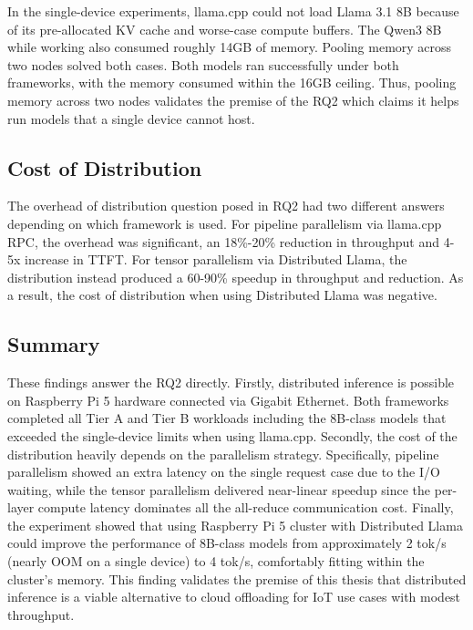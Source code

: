 In the single-device experiments, llama.cpp could not load Llama 3.1 8B because of its pre-allocated KV cache and worse-case compute buffers. The Qwen3 8B while working also consumed roughly 14GB of memory. Pooling memory across two nodes solved both cases. Both models ran successfully under both frameworks, with the memory consumed within the 16GB ceiling. Thus, pooling memory across two nodes validates the premise of the RQ2 which claims it helps run models that a single device cannot host.

\subsection{Cost of Distribution}
The overhead of distribution question posed in RQ2 had two different answers depending on which framework is used. For pipeline parallelism via llama.cpp RPC, the overhead was significant, an 18\%-20\% reduction in throughput and 4-5x increase in TTFT. For tensor parallelism via Distributed Llama, the distribution instead produced a 60-90\% speedup in throughput and reduction. As a result, the cost of distribution when using Distributed Llama was negative.

\subsection{Summary}
These findings answer the RQ2 directly. Firstly, distributed inference is possible on Raspberry Pi 5 hardware connected via Gigabit Ethernet. Both frameworks completed all Tier A and Tier B workloads including the 8B-class models that exceeded the single-device limits when using llama.cpp. Secondly, the cost of the distribution heavily depends on the parallelism strategy. Specifically, pipeline parallelism showed an extra latency on the single request case due to the I/O waiting, while the tensor parallelism delivered near-linear speedup since the per-layer compute latency dominates all the all-reduce communication cost. Finally, the experiment showed that using Raspberry Pi 5 cluster with Distributed Llama could improve the performance of 8B-class models from approximately 2 tok/s (nearly OOM on a single device) to 4 tok/s, comfortably fitting within the cluster's memory. This finding validates the premise of this thesis that distributed inference is a viable alternative to cloud offloading for IoT use cases with modest throughput.

